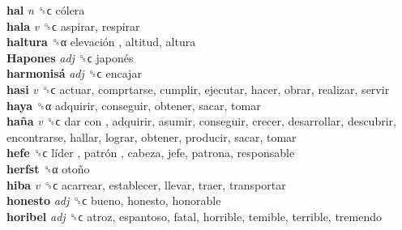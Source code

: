 \textbf{hal} \emph{n}  ␝ϲ   cólera   \\
\textbf{hala} \emph{v}  ␝ϲ  aspirar, respirar  \\
\textbf{haltura} ␝α   elevación , altitud, altura  \\
\textbf{Hapones} \emph{adj}  ␝ϲ   japonés   \\
\textbf{harmonisá} \emph{adj}  ␝ϲ  encajar  \\
\textbf{hasi} \emph{v}  ␝ϲ  actuar, comprtarse, cumplir, ejecutar, hacer, obrar, realizar, servir  \\
\textbf{haya} ␝α  adquirir, conseguir, obtener, sacar, tomar  \\
\textbf{haña} \emph{v}  ␝ϲ   dar con , adquirir, asumir, conseguir, crecer, desarrollar, descubrir, encontrarse, hallar, lograr, obtener, producir, sacar, tomar  \\
\textbf{hefe} ␝ϲ   líder ,  patrón , cabeza, jefe, patrona, responsable  \\
\textbf{herfst} ␝α   otoño   \\
\textbf{hiba} \emph{v}  ␝ϲ  acarrear, establecer, llevar, traer, transportar  \\
\textbf{honesto} \emph{adj}  ␝ϲ  bueno, honesto, honorable  \\
\textbf{horibel} \emph{adj}  ␝ϲ  atroz, espantoso, fatal, horrible, temible, terrible, tremendo  \\
